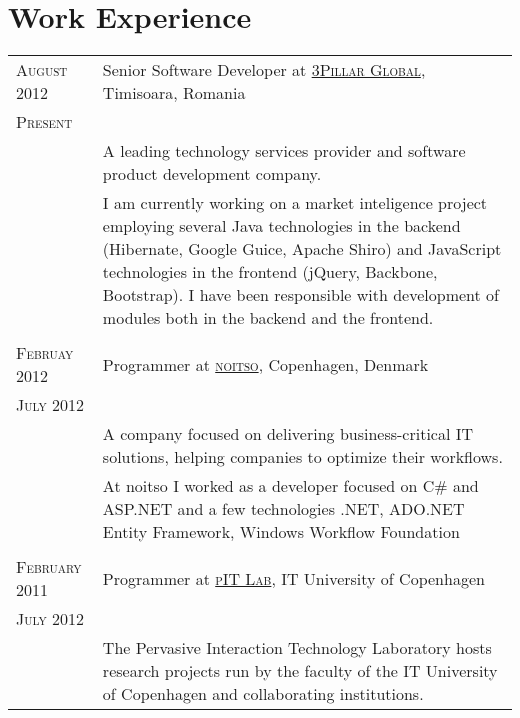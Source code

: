 \documentclass[a4paper,10pt]{article}
\begin{document}
\section{Work Experience}
\begin{tabular}{p{2.5cm}|p{11cm}}


 \raggedleft \textsc{August 2012} & Senior Software Developer at
 \textsc{\href{http://www.3pillarglobal.com/}{3Pillar Global}}, Timisoara, Romania
 \\\raggedleft \textsc{Present}\\& 
 \footnotesize{A leading technology services provider and software product development company.}\\
& \footnotesize{I am currently working on a market inteligence project employing several Java technologies in the backend (Hibernate, Google Guice, Apache Shiro) and JavaScript technologies in the
frontend (jQuery, Backbone, Bootstrap). I have been responsible with development of modules both in the backend and the frontend.}\\
\multicolumn{2}{c}{} \\ 

 \raggedleft \textsc{Februay 2012} & Programmer at
 \textsc{\href{http://www.noitso.dk/}{noitso}}, Copenhagen, Denmark
 \\\raggedleft \textsc{July 2012}\\& 
 \footnotesize{A company focused on delivering business-critical IT solutions, helping companies to optimize their workflows.}\\

& \footnotesize{At noitso I worked as a developer focused on C\# and ASP.NET and a few technologies .NET, ADO.NET Entity
Framework, Windows Workflow Foundation}\\
\multicolumn{2}{c}{} \\ 

 \raggedleft \textsc{February 2011} & Programmer at
 \textsc{\href{http://www.itu.dk/pit/}{pIT Lab}}, IT University of Copenhagen
 \\\raggedleft \textsc{July 2012}\\& 
 \footnotesize{The Pervasive Interaction Technology Laboratory hosts research
 projects run by the faculty of the IT University of Copenhagen and
 collaborating institutions.}\\


\end{tabular}
\end{document}
